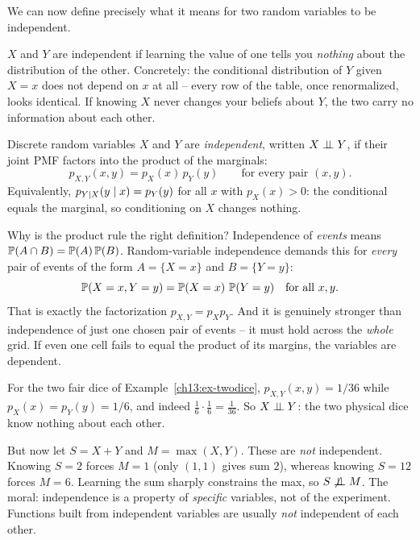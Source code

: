 We can now define precisely what it means for two random variables to be independent.

\begin{intuitionbox}
$X$ and $Y$ are independent if learning the value of one tells you \emph{nothing}
about the distribution of the other. Concretely: the conditional distribution of
$Y$ given $X=x$ does not depend on $x$ at all -- every row of the table, once
renormalized, looks identical. If knowing $X$ never changes your beliefs about
$Y$, the two carry no information about each other.
\end{intuitionbox}

\begin{definition}
\label{ch13:def-indep}
Discrete random variables $X$ and $Y$ are \emph{independent}, written
$X \indep Y$, if their joint PMF factors into the product of the marginals:
\[
  p_{X,Y}(x,y) = p_X(x)\, p_Y(y) \qquad \text{for every pair } (x,y).
\]
Equivalently, $p_{Y\given X}(y\given x) = p_Y(y)$ for all $x$ with $p_X(x)>0$:
the conditional equals the marginal, so conditioning on $X$ changes nothing.
\end{definition}

\begin{whybox}
Why is the product rule the right definition? Independence of \emph{events} means
$\P(A\cap B)=\P(A)\P(B)$. Random-variable independence demands this for
\emph{every} pair of events of the form $A=\{X=x\}$ and $B=\{Y=y\}$:
\[
  \P(X=x, Y=y) = \P(X=x)\,\P(Y=y) \quad\text{for all } x,y.
\]
That is exactly the factorization $p_{X,Y}=p_X p_Y$. And it is genuinely
stronger than independence of just one chosen pair of events -- it must hold
across the \emph{whole} grid. If even one cell fails to equal the product of its
margins, the variables are dependent.
\end{whybox}

\begin{example}
\label{ch13:ex-dice-indep}
For the two fair dice of Example~\ref{ch13:ex-twodice},
$p_{X,Y}(x,y)=1/36$ while $p_X(x)=p_Y(y)=1/6$, and indeed
$\tfrac{1}{6}\cdot\tfrac{1}{6}=\tfrac{1}{36}$. So $X \indep Y$: the two physical
dice know nothing about each other.

But now let $S=X+Y$ and $M=\max(X,Y)$. These are \emph{not} independent. Knowing
$S=2$ forces $M=1$ (only $(1,1)$ gives sum $2$), whereas knowing $S=12$ forces
$M=6$. Learning the sum sharply constrains the max, so $S\not\indep M$. The
moral: independence is a property of \emph{specific} variables, not of the
experiment. Functions built from independent variables are usually \emph{not}
independent of each other.
\end{example}

